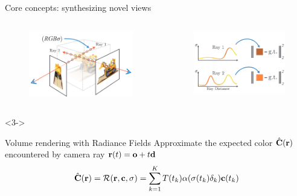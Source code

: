 \documentclass[aspectratio=1610,handout]{beamer}
\begin{document}
\begin{frame}{Core concepts: synthesizing novel views}
    \begin{columns}
        \begin{column}{.5\textwidth}
            \begin{figure}[H]
                \includegraphics[width=.7\textwidth,keepaspectratio]{density-1}
            \end{figure}
        \end{column}
        \pause
        \begin{column}{.5\textwidth}
            \begin{figure}[H]
                \includegraphics[width=.7\textwidth,keepaspectratio]{density-2}
            \end{figure}
        \end{column}
    \end{columns}
    \begin{onlyenv}<3->
        \begin{block}{Volume rendering with Radiance Fields} 
            Approximate the expected color \(\hat{\vb{C}}(\vb{r})\) encountered by camera ray \(\vb{r}(t) = \vb{o} + t\vb{d}\)
            \begin{equation*}
                \hat{\vb{C}}(\vb{r}) = \mathcal{R}(\vb{r}, \vb{c}, \sigma) = \sum_{k = 1}^{K} T(t_k) \alpha (\sigma (t_k)\delta_k) \vb{c}(t_k)
            \end{equation*}
        \end{block}
    \end{onlyenv}
\end{frame}
\end{document}
